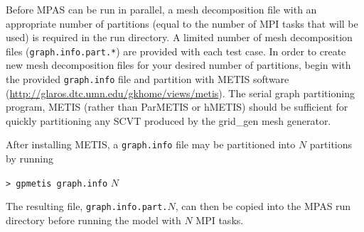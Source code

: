 Before MPAS can be run in parallel, a mesh decomposition file with an appropriate number of 
partitions (equal to the number of MPI tasks that will be used) is required in the run directory.  A limited number of mesh decomposition files ({\tt graph.info.part.*}) are provided with each test case.  In order to create new mesh decomposition files for your desired number of partitions, begin with the provided {\tt graph.info} file and partition with METIS software (\url{http://glaros.dtc.umn.edu/gkhome/views/metis}). The serial graph partitioning program, METIS (rather than ParMETIS or hMETIS) should be sufficient for quickly partitioning any SCVT produced by the grid\_gen mesh generator.

After installing METIS, a {\tt graph.info} file may be partitioned into $N$ partitions by running

\vspace{12pt}
{\tt > gpmetis graph.info} $N$
\vspace{12pt}

\noindent The resulting file, {\tt graph.info.part.}$N$, can then be copied into the MPAS run directory
before running the model with $N$ MPI tasks.
